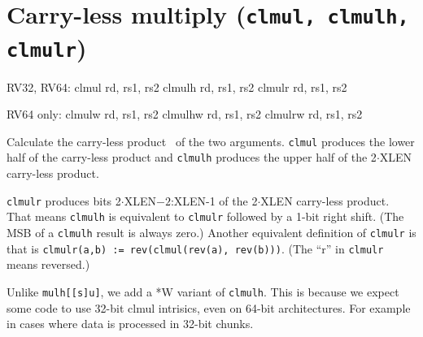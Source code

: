 %
%
%
%
%
%
%
%


\section{Carry-less multiply (\texttt{clmul, clmulh, clmulr})}

\begin{rvb}
  RV32, RV64:
    clmul  rd, rs1, rs2
    clmulh rd, rs1, rs2
    clmulr rd, rs1, rs2

  RV64 only:
    clmulw  rd, rs1, rs2
    clmulhw rd, rs1, rs2
    clmulrw rd, rs1, rs2
\end{rvb}

Calculate the carry-less product~\cite{CarryLessProduct} of the two arguments. \texttt{clmul}
produces the lower half of the carry-less product and \texttt{clmulh} produces the upper half
of the 2$\cdot$XLEN carry-less product.

\texttt{clmulr} produces bits 2$\cdot$XLEN$-2$:XLEN-1 of the 2$\cdot$XLEN carry-less product.
That means \texttt{clmulh} is equivalent to \texttt{clmulr} followed by a 1-bit right shift.
(The MSB of a \texttt{clmulh} result is always zero.) Another equivalent definition of
\texttt{clmulr} is that is \texttt{clmulr(a,b) := rev(clmul(rev(a), rev(b)))}. (The ``r''
in \texttt{clmulr} means reversed.)

Unlike {\tt mulh[[s]u]}, we add a *W variant of {\tt clmulh}. This is because we expect
some code to use 32-bit clmul intrisics, even on 64-bit architectures. For example in cases
where data is processed in 32-bit chunks.



